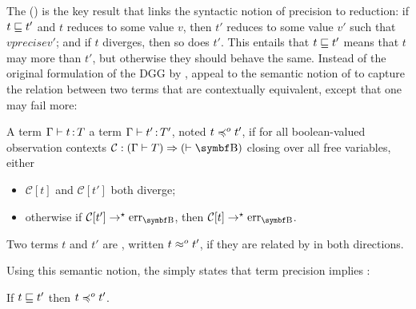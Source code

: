 \AP The  () is the key result that
links the syntactic notion of precision to reduction:
if $t \sqsubseteq t'$ and $t$ reduces to some value $v$, then
$t'$ reduces to some value $v'$ such that $v precise v'$;
and if $t$ diverges, then so does $t'$.
This  entails that $t \sqsubseteq t'$ means that $t$ may  more than $t'$,
but otherwise they should behave the same.
%
Instead of the original formulation of the DGG by
\textcite{Siek2015},  appeal to the
semantic notion of  to capture
the relation between two terms that are contextually equivalent, except
that one may fail more:%

\begin{definition}
\label{def:obsapprox}
  A term $\Gamma \vdash t \operatorname{:} T$ 
  a term $\Gamma \vdash t' \operatorname{:} T'$, noted $ t
  \preccurlyeq^{o} t'$, if for all boolean-valued observation contexts
  $\mathcal{C} : (\Gamma \vdash T) \Rightarrow (\vdash \Bool)$
  closing over all free variables, either
  \begin{itemize}
  \item $\mathcal{C}[t]$ and $\mathcal{C}[t']$ both diverge; 
  \item otherwise if $\mathcal{C}[t'] \red \err[\Bool]$, then $\mathcal{C}[t] \red \err[\Bool]$.
  \end{itemize}

  Two terms $t$ and $t'$ are , written $t \approx^{o} t'$,
  if they are related by  in both directions.
\end{definition}

Using this semantic notion, the  simply states that term 
precision implies :

\begin{property}
If $t \sqsubseteq t'$ then $t \preccurlyeq^{o} t'$.
\end{property}

